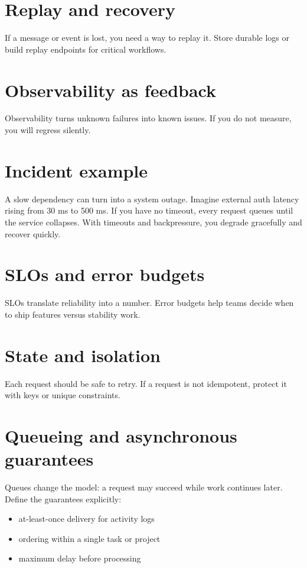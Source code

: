 \section{Replay and recovery}
If a message or event is lost, you need a way to replay it.
Store durable logs or build replay endpoints for critical workflows.

\section{Observability as feedback}
Observability turns unknown failures into known issues.
If you do not measure, you will regress silently.

\section{Incident example}
A slow dependency can turn into a system outage.
Imagine external auth latency rising from 30 ms to 500 ms.
If you have no timeout, every request queues until the service collapses.
With timeouts and backpressure, you degrade gracefully and recover quickly.

\section{SLOs and error budgets}
SLOs translate reliability into a number.
Error budgets help teams decide when to ship features versus stability work.

\section{State and isolation}
Each request should be safe to retry.
If a request is not idempotent, protect it with keys or unique constraints.

\section{Queueing and asynchronous guarantees}
Queues change the model: a request may succeed while work continues later.
Define the guarantees explicitly:
\begin{itemize}[nosep]
  \item at-least-once delivery for activity logs
  \item ordering within a single task or project
  \item maximum delay before processing
\end{itemize}

